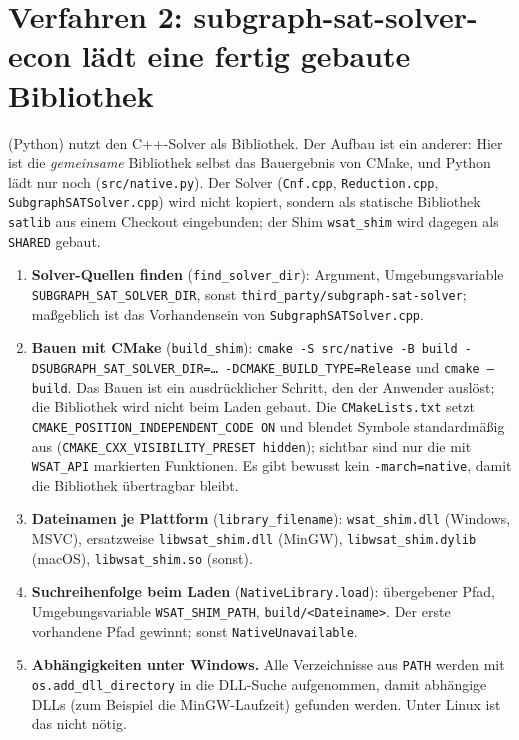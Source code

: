 \section{Verfahren 2: subgraph-sat-solver-econ lädt eine fertig gebaute Bibliothek}
\label{sec:laden_econ}

 (Python) nutzt den C++-Solver als Bibliothek. Der Aufbau ist ein anderer: Hier ist die \emph{gemeinsame} Bibliothek selbst das Bauergebnis von CMake, und Python lädt nur noch (\texttt{src/native.py}). Der Solver (\texttt{Cnf.cpp}, \texttt{Reduction.cpp}, \texttt{SubgraphSATSolver.cpp}) wird nicht kopiert, sondern als statische Bibliothek \texttt{satlib} aus einem Checkout eingebunden; der Shim \texttt{wsat\_shim} wird dagegen als \texttt{SHARED} gebaut.

\begin{enumerate}
	\item \textbf{Solver-Quellen finden} (\texttt{find\_solver\_dir}): Argument, Umgebungsvariable \texttt{SUBGRAPH\_SAT\_SOLVER\_DIR}, sonst \texttt{third\_party/subgraph-sat-solver}; maßgeblich ist das Vorhandensein von \texttt{SubgraphSATSolver.cpp}.
	\item \textbf{Bauen mit CMake} (\texttt{build\_shim}): \texttt{cmake -S src/native -B build -DSUBGRAPH\_SAT\_SOLVER\_DIR=\ldots\ -DCMAKE\_BUILD\_TYPE=Release} und \texttt{cmake --build}. Das Bauen ist ein ausdrücklicher Schritt, den der Anwender auslöst; die Bibliothek wird nicht beim Laden gebaut. Die \texttt{CMakeLists.txt} setzt \texttt{CMAKE\_POSITION\_INDEPENDENT\_CODE ON} und blendet Symbole standardmäßig aus (\texttt{CMAKE\_CXX\_VISIBILITY\_PRESET hidden}); sichtbar sind nur die mit \texttt{WSAT\_API} markierten Funktionen. Es gibt bewusst kein \texttt{-march=native}, damit die Bibliothek übertragbar bleibt.
	\item \textbf{Dateinamen je Plattform} (\texttt{library\_filename}): \texttt{wsat\_shim.dll} (Windows, MSVC), ersatzweise \texttt{libwsat\_shim.dll} (MinGW), \texttt{libwsat\_shim.dylib} (macOS), \texttt{libwsat\_shim.so} (sonst).
	\item \textbf{Suchreihenfolge beim Laden} (\texttt{NativeLibrary.load}): übergebener Pfad, Umgebungsvariable \texttt{WSAT\_SHIM\_PATH}, \texttt{build/<Dateiname>}. Der erste vorhandene Pfad gewinnt; sonst \texttt{NativeUnavailable}.
	\item \textbf{Abhängigkeiten unter Windows.} Alle Verzeichnisse aus \texttt{PATH} werden mit \texttt{os.add\_dll\_directory} in die DLL-Suche aufgenommen, damit abhängige DLLs (zum Beispiel die MinGW-Laufzeit) gefunden werden. Unter Linux ist das nicht nötig.

\end{enumerate}
